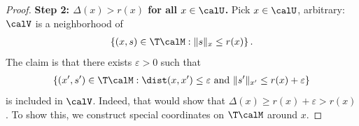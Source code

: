\begin{proof}
	
	\textbf{Step 2: $\Delta(x) > r(x)$ for all $x \in \calU$.}
	Pick $x \in \calU$, arbitrary: $\calV$ is a neighborhood of
	\begin{align}
	\left\{ (x, s) \in \T\calM : \|s\|_x \leq r(x) \right\}.
	\label{eq:DeltalargerthanrmanifoldsetA}
	\end{align}
	The claim is that there exists $\varepsilon > 0$ such that
	\begin{align}
	\left\{ (x', s') \in \T\calM : \dist(x, x') \leq \varepsilon \textrm{ and } \|s'\|_{x'} \leq r(x) + \varepsilon \right\}
	\label{eq:DeltalargerthanrmanifoldsetB}
	\end{align}
	is included in $\calV$. Indeed, that would show that $\Delta(x) \geq r(x) + \varepsilon > r(x)$. To show this, we construct special coordinates on $\T\calM$ around $x$.
	

\end{proof}
